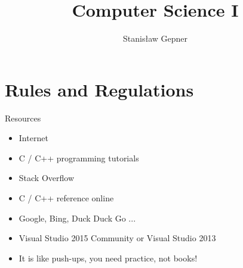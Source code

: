 \documentclass[10pt]{beamer}
\title{Computer Science I}
\author[shortname]{Stanis{\l}aw Gepner}
\institute[shortinst]{room 117, sgepner@meil.pw.edu.pl}
\date{}
\begin{document}
\frame{
    \titlepage
}

\section{Rules and Regulations}


\begin{frame}{Resources}
  \begin{itemize}
    \item Internet
    \item C / C++ programming tutorials
    \item Stack Overflow
    \item C / C++ reference online
    \item Google, Bing, Duck Duck Go ...
    \item Visual Studio 2015 Community or Visual Studio 2013
    \item It is like push-ups, you need practice, not books!
  \end{itemize}
\end{frame}
\end{document}
